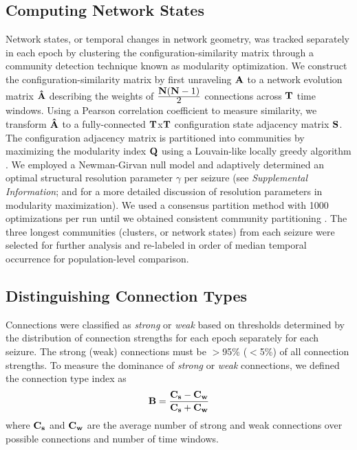 \subsection{Computing Network States}
    Network states, or temporal changes in network geometry, was tracked separately in each epoch by clustering the configuration-similarity matrix through a community detection technique known as modularity optimization. We construct the configuration-similarity matrix by first unraveling $\mathbf{\displaystyle A}$ to a network evolution matrix $\mathbf{\displaystyle \hat A}$ describing the weights of $\frac{\displaystyle \mathbf{\displaystyle N}(\mathbf{\displaystyle N}-1)}{\displaystyle 2}$ connections across $\mathbf{\displaystyle T}$ time windows. Using a Pearson correlation coefficient to measure similarity, we transform $\mathbf{\displaystyle \hat A}$ to a fully-connected $\mathbf{\displaystyle T}$x$\mathbf{\displaystyle T}$ configuration state adjacency matrix $\mathbf{\displaystyle S}$. The configuration adjacency matrix is partitioned into communities by maximizing the modularity index $\mathbf{\displaystyle Q}$ \cite{newman2004finding} using a Louvain-like locally greedy algorithm \cite{blondel2008fast}. We employed a Newman-Girvan null model \cite{newman2006modularity, porter2009communities} and adaptively determined an optimal structural resolution parameter $\gamma$ per seizure (see \textit{Supplemental Information}; and \cite{bassett2013robust} for a more detailed discussion of resolution parameters in modularity maximization). We used a consensus partition method with 1000 optimizations per run until we obtained consistent community partitioning \cite{lancichinetti2012consensus, bassett2013robust}. The three longest communities (clusters, or network states) from each seizure were selected for further analysis and re-labeled in order of median temporal occurrence for population-level comparison.

\subsection{Distinguishing Connection Types}
    Connections were classified as \emph{strong} or \emph{weak} based on thresholds determined by the distribution of connection strengths for each epoch separately for each seizure. The strong (weak) connections must be $>$95\% ($<$5\%) of all connection strengths. To measure the dominance of \emph{strong} or \emph{weak} connections, we defined the connection type index as
    \begin{eqnarray}
        \mathbf{\displaystyle B} = \frac{\mathbf{\displaystyle C_s}-\mathbf{\displaystyle C_w}}{\mathbf{\displaystyle C_s}+\mathbf{\displaystyle C_w}}
    \end{eqnarray}
where $\mathbf{\displaystyle C_s}$ and $\mathbf{\displaystyle C_w}$ are the average number of strong and weak connections over possible connections and number of time windows.

